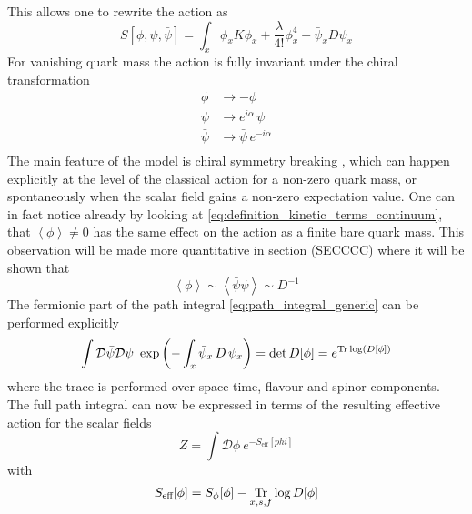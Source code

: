 This allows one to rewrite the action as
\begin{equation*}
    S[\phi,\psi,\bar\psi] = \int_x \phi_x K \phi_x + \frac{\lambda}{4!}\phi_x^4 + \bar\psi_x D \psi_x
\end{equation*}
For vanishing quark mass the action is fully invariant under the chiral transformation
\begin{equation}
    \begin{aligned}
        \phi &\to -\phi \\
        \psi &\to e^{i\alpha} \, \psi \\
        \bar\psi &\to \bar\psi \, e^{-i\alpha} \\
    \end{aligned}
    \label{eq:yukawa_continuum_rewritten}
\end{equation}
The main feature of the model is chiral symmetry breaking \cite{Nambu1961DynamicalI, Nambu1961DynamicalII}, which can happen explicitly at the level of the classical action for a non-zero quark mass, or spontaneously when the scalar field gains a non-zero expectation value. One can in fact notice already by looking at \eqref{eq:definition_kinetic_terms_continuum}, that $\left\langle\phi\right\rangle \neq 0$ has the same effect on the action as a finite bare quark mass. This observation will be made more quantitative in section (SECCCC) where it will be shown that  
\begin{equation*}
    \left\langle \phi \right\rangle \sim \left\langle \bar \psi \psi \right\rangle \sim D^{-1}
\end{equation*}
The fermionic part of the path integral \eqref{eq:path_integral_generic} can be performed explicitly
\begin{equation*}
    \int \mathcal{D} \bar\psi \mathcal{D} \psi \ \exp\left( - \int_x \bar\psi_x \,  D \, \psi_x \right) = \text{det} \, D[\phi] = e^{\operatorname{\text{Tr}} \log (D[\phi])}
\end{equation*}
where the trace is performed over space-time, flavour and spinor components. \\ 
The full path integral can now be expressed in terms of the resulting effective action for the scalar fields
\begin{equation*}
    Z = \int \mathcal{D}\phi \ e^{-S_\text{eff}[phi]}
\end{equation*}
with
\begin{equation}
    S_\text{eff}[\phi] = S_{\phi}[\phi] - \underset{x,s,f}{\operatorname{\text{Tr}}} \log D[\phi]
    \label{eq:effective_action_no_fermions}
\end{equation}
